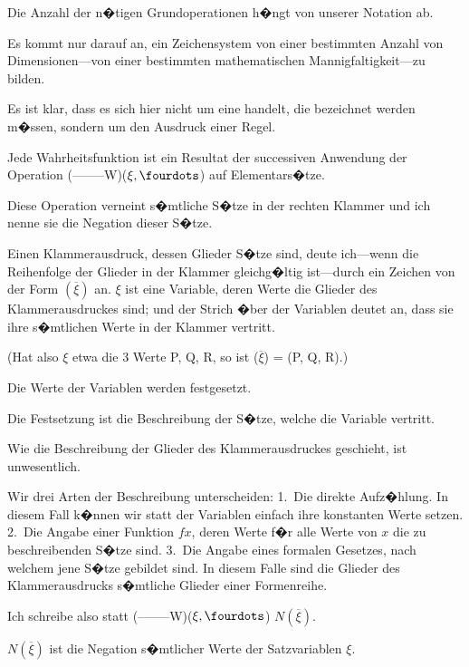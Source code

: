 {Die Anzahl der n�tigen Grundoperationen h�ngt
 von unserer Notation ab.}


{Es kommt nur darauf an, ein Zeichensystem von
einer bestimmten Anzahl von Dimensionen---von
einer bestimmten mathematischen Man\-nig\-fal\-tig\-keit---zu
bilden.}


{Es ist klar, dass es sich hier nicht um eine
 handelt, die
bezeichnet werden m�ssen, sondern um den
Ausdruck einer Regel.}


{Jede Wahrheitsfunktion ist ein Resultat der
successiven Anwendung der Operation \mbox{(--\;--\;--\;--\;--W)}\AllowBreak($\xi, \fourdots$)
auf Elementars�tze.

Diese Operation verneint s�mtliche S�tze in der
rechten Klammer und ich nenne sie die Negation
dieser S�tze.}


{Einen Klammerausdruck, dessen Glieder S�tze
sind, deute ich\AllowBreak---wenn die Reihenfolge der Glieder in
der Klammer gleichg�ltig ist---durch ein Zeichen von
der Form \glqq{}$(\overline{\xi})$\grqq{} an. \glqq{}$\xi$\grqq{} ist eine Variable, deren Werte
die Glieder des Klammerausdruckes sind; und der
Strich �ber der Variablen deutet an, dass sie ihre
s�mtlichen Werte in der Klammer vertritt.

(Hat also $\xi$ etwa die 3 Werte P, Q, R, so ist
($\overline{\xi}$) = (P, Q, R).)

Die Werte der Variablen werden festgesetzt.

Die Festsetzung ist die Beschreibung der S�tze,
welche die Variable vertritt.

Wie die Beschreibung der Glieder des Klammerausdruckes
geschieht, ist unwesentlich.

Wir  drei Arten der Beschreibung
unterscheiden: 1.~Die direkte Aufz�hlung. In
diesem Fall k�nnen wir statt der Variablen einfach
ihre konstanten Werte setzen. 2.~Die Angabe
einer Funktion $fx$, deren Werte f�r alle Werte von
$x$ die zu beschreibenden S�tze sind. 3.~Die Angabe
eines formalen Gesetzes, nach welchem jene S�tze
gebildet sind. In diesem Falle sind die Glieder des
Klammerausdrucks s�mtliche Glieder einer Formenreihe.}


{Ich schreibe also statt \mbox{\glqq{}(--\;--\;--\;--\;--W)}\AllowBreak($\xi, \fourdots$)\grqq{}
\glqq{}$N(\overline{\xi})$\grqq{}.

$N(\overline{\xi})$ ist die Negation s�mtlicher Werte der
Satzvariablen $\xi$.}


